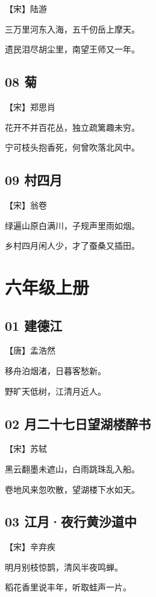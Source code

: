 \documentclass[a6paper, 12pt]{article}
\begin{document}
【宋】陆游

三万里河东入海，五千仞岳上摩天。

遗民泪尽胡尘里，南望王师又一年。

\subsection*{08 菊}

【宋】郑思肖

花开不并百花丛，独立疏篱趣未穷。

宁可枝头抱香死，何曾吹落北风中。

\subsection*{09 村四月}

【宋】翁卷

绿遍山原白满川，子规声里雨如烟。

乡村四月闲人少，才了蚕桑又插田。

\newpage

\section*{六年级上册}

\subsection*{01 建德江}

【唐】孟浩然

移舟泊烟渚，日暮客愁新。

野旷天低树，江清月近人。

\subsection*{02 月二十七日望湖楼醉书}

【宋】苏轼

黑云翻墨未遮山，白雨跳珠乱入船。

卷地风来忽吹散，望湖楼下水如天。

\subsection*{03 江月·夜行黄沙道中}

【宋】辛弃疾

明月别枝惊鹊，清风半夜鸣蝉。

稻花香里说丰年，听取蛙声一片。
\end{document}
